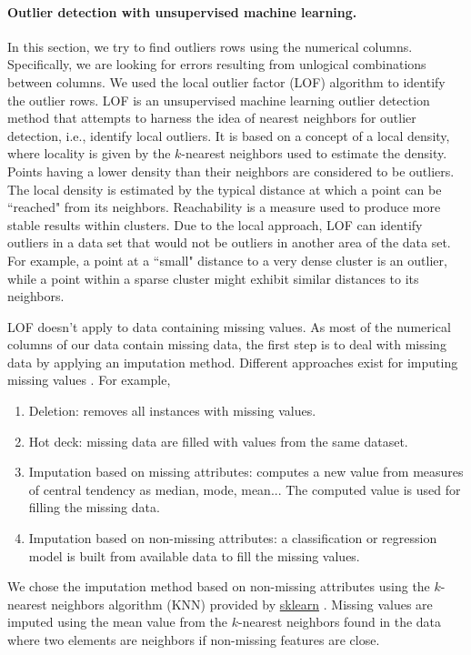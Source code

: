 \documentclass{article}
\begin{document}
\paragraph{Outlier detection with unsupervised machine learning.} %
\label{sub:Outlier detection with machine learning}
In this section, we try to find outliers rows using the numerical columns.
Specifically, we are looking for errors resulting from unlogical combinations between columns.
We used the local outlier factor (LOF) algorithm to identify the outlier rows.
LOF is an unsupervised machine learning outlier detection method that attempts to harness the idea of nearest neighbors for outlier detection, i.e., identify local outliers.
It is based on a concept of a local density, where locality is given by the $k$-nearest neighbors used to estimate the density.
Points having a lower density than their neighbors are considered to be outliers.
The local density is estimated by the typical distance at which a point can be ``reached" from its neighbors.
Reachability is a measure used to produce more stable results within clusters.
Due to the local approach, LOF can identify outliers in a data set that would not be outliers in another area of the data set.
For example, a point at a ``small" distance to a very dense cluster is an outlier, while a point within a sparse cluster might exhibit similar distances to its neighbors.

LOF doesn't apply to data containing missing values.
As most of the numerical columns of our data contain missing data, the first step is to deal with missing data by applying an imputation method.
Different approaches exist for imputing missing values \cite{corr_lede}.
For example,
\begin{enumerate}
    \item Deletion: removes all instances with missing values.
    \item Hot deck: missing data are filled with values from the same dataset.
    \item Imputation based on missing attributes: computes a new value from measures of central tendency as median, mode, mean...
    The computed value is used for filling the missing data.
    \item Imputation based on non-missing attributes: a classification or regression model is built from available data to fill the missing values.
\end{enumerate}
We chose the imputation method based on non-missing attributes using the $k$-nearest neighbors algorithm (KNN) provided by \href{https://scikit-learn.org/stable/modules/generated/sklearn.impute.KNNImputer.html}{sklearn} \cite{Olga+al:2001}.
Missing values are imputed using the mean value from the $k$-nearest neighbors found in the data where two elements are neighbors if non-missing features are close.
\end{document}
